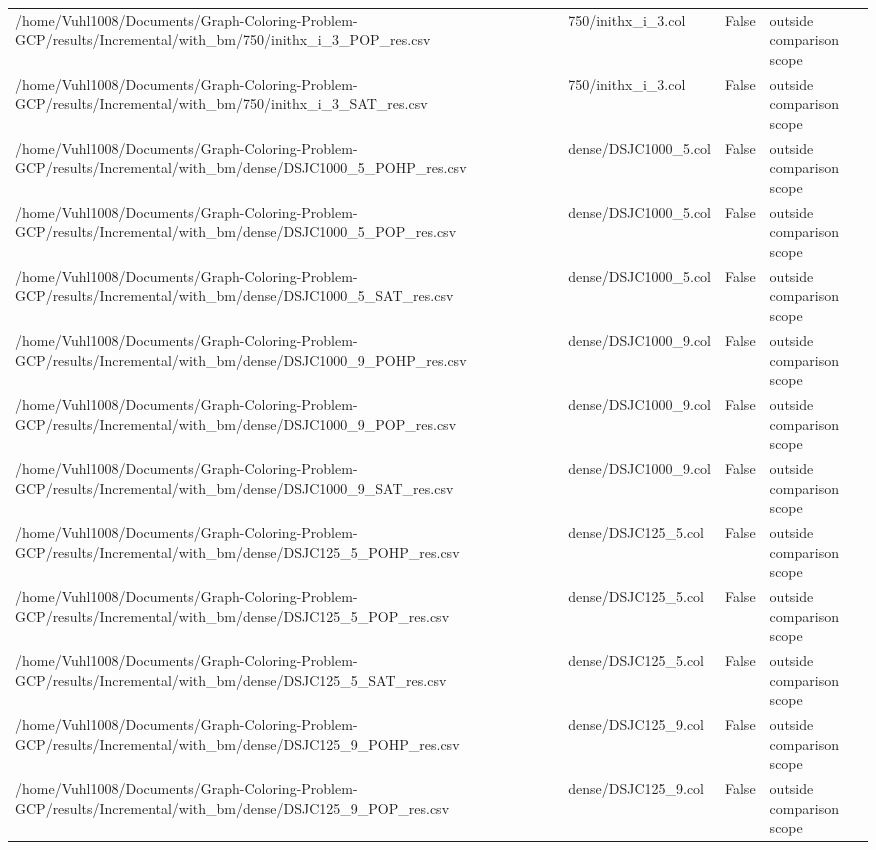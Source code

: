 \begin{table}[htbp]
\begin{tabular}{llll}
/home/Vuhl1008/Documents/Graph-Coloring-Problem-GCP/results/Incremental/with\_bm/750/inithx\_i\_3\_POP\_res.csv & 750/inithx\_i\_3.col & False & outside comparison scope \\
/home/Vuhl1008/Documents/Graph-Coloring-Problem-GCP/results/Incremental/with\_bm/750/inithx\_i\_3\_SAT\_res.csv & 750/inithx\_i\_3.col & False & outside comparison scope \\
/home/Vuhl1008/Documents/Graph-Coloring-Problem-GCP/results/Incremental/with\_bm/dense/DSJC1000\_5\_POHP\_res.csv & dense/DSJC1000\_5.col & False & outside comparison scope \\
/home/Vuhl1008/Documents/Graph-Coloring-Problem-GCP/results/Incremental/with\_bm/dense/DSJC1000\_5\_POP\_res.csv & dense/DSJC1000\_5.col & False & outside comparison scope \\
/home/Vuhl1008/Documents/Graph-Coloring-Problem-GCP/results/Incremental/with\_bm/dense/DSJC1000\_5\_SAT\_res.csv & dense/DSJC1000\_5.col & False & outside comparison scope \\
/home/Vuhl1008/Documents/Graph-Coloring-Problem-GCP/results/Incremental/with\_bm/dense/DSJC1000\_9\_POHP\_res.csv & dense/DSJC1000\_9.col & False & outside comparison scope \\
/home/Vuhl1008/Documents/Graph-Coloring-Problem-GCP/results/Incremental/with\_bm/dense/DSJC1000\_9\_POP\_res.csv & dense/DSJC1000\_9.col & False & outside comparison scope \\
/home/Vuhl1008/Documents/Graph-Coloring-Problem-GCP/results/Incremental/with\_bm/dense/DSJC1000\_9\_SAT\_res.csv & dense/DSJC1000\_9.col & False & outside comparison scope \\
/home/Vuhl1008/Documents/Graph-Coloring-Problem-GCP/results/Incremental/with\_bm/dense/DSJC125\_5\_POHP\_res.csv & dense/DSJC125\_5.col & False & outside comparison scope \\
/home/Vuhl1008/Documents/Graph-Coloring-Problem-GCP/results/Incremental/with\_bm/dense/DSJC125\_5\_POP\_res.csv & dense/DSJC125\_5.col & False & outside comparison scope \\
/home/Vuhl1008/Documents/Graph-Coloring-Problem-GCP/results/Incremental/with\_bm/dense/DSJC125\_5\_SAT\_res.csv & dense/DSJC125\_5.col & False & outside comparison scope \\
/home/Vuhl1008/Documents/Graph-Coloring-Problem-GCP/results/Incremental/with\_bm/dense/DSJC125\_9\_POHP\_res.csv & dense/DSJC125\_9.col & False & outside comparison scope \\
/home/Vuhl1008/Documents/Graph-Coloring-Problem-GCP/results/Incremental/with\_bm/dense/DSJC125\_9\_POP\_res.csv & dense/DSJC125\_9.col & False & outside comparison scope \\

\end{tabular}
\end{table}
